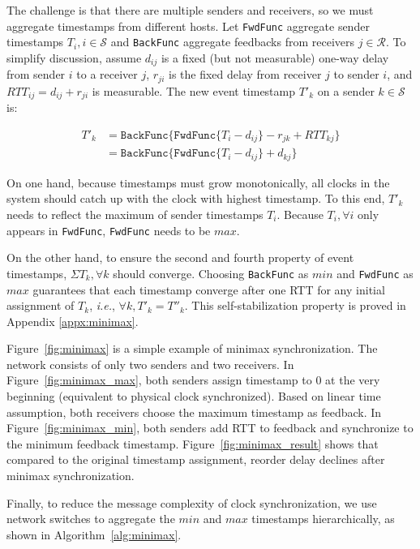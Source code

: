The challenge is that there are multiple senders and receivers, so we must aggregate timestamps from different hosts.
Let \texttt{FwdFunc} aggregate sender timestamps $T_i, i \in \mathcal{S}$ and \texttt{BackFunc} aggregate feedbacks from receivers $j \in \mathcal{R}$.
To simplify discussion, assume $d_{ij}$ is a fixed (but not measurable) one-way delay from sender $i$ to a receiver $j$, $r_{ji}$ is the fixed delay from receiver $j$ to sender $i$, and $RTT_{ij} = d_{ij} + r_{ji}$ is measurable. The new event timestamp $T'_k$ on a sender $k \in \mathcal{S}$ is:

\begin{equation*}
\begin{aligned}
T'_k & = \texttt{BackFunc} \{ \texttt{FwdFunc} \{ T_i - d_{ij} \} - r_{jk} + RTT_{kj} \} \\
     & = \texttt{BackFunc} \{ \texttt{FwdFunc} \{ T_i - d_{ij} \} + d_{kj} \}
\end{aligned}
\end{equation*}

On one hand, because timestamps must grow monotonically, all clocks in the system should catch up with the clock with highest timestamp.
To this end, $T'_k$ needs to reflect the maximum of sender timestamps $T_i$. Because $T_i, \forall i$ only appears in \texttt{FwdFunc}, \texttt{FwdFunc} needs to be $max$.

On the other hand, to ensure the second and fourth property of event timestamps, $\Sigma T_k, \forall k$ should converge. Choosing \texttt{BackFunc} as $min$ and \texttt{FwdFunc} as $max$ guarantees that each timestamp converge after one RTT for any initial assignment of $T_k$, \textit{i.e.}, $\forall k, T'_k = T''_k$. This self-stabilization property is proved in Appendix \ref{appx:minimax}.

Figure~\ref{fig:minimax} is a simple example of minimax synchronization.
The network consists of only two senders and two receivers.
In Figure~\ref{fig:minimax_max}, both senders assign timestamp to $0$ at the very beginning (equivalent to physical clock synchronized).
Based on linear time assumption, both receivers choose the maximum timestamp as feedback.
In Figure~\ref{fig:minimax_min}, both senders add RTT to feedback and synchronize to the minimum feedback timestamp.
Figure~\ref{fig:minimax_result} shows that compared to the original timestamp assignment, reorder delay declines after minimax synchronization.

Finally, to reduce the message complexity of clock synchronization, we use network switches to aggregate the $min$ and $max$ timestamps hierarchically, as shown in Algorithm~\ref{alg:minimax}.

